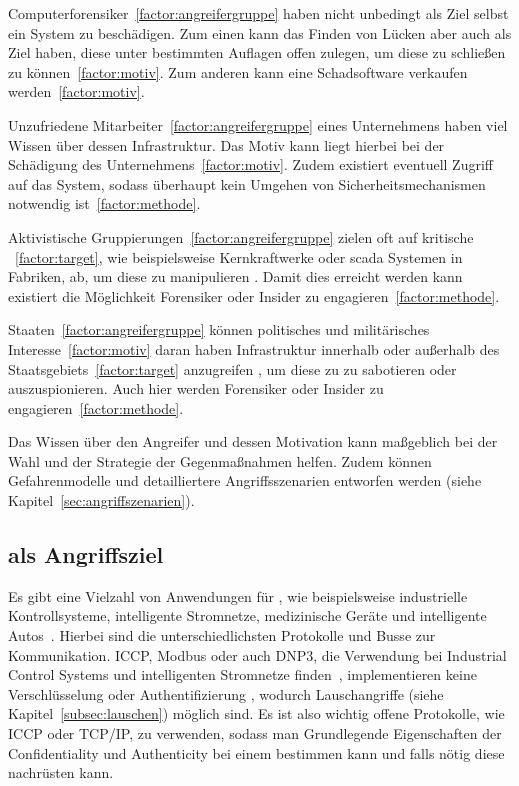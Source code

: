 Computerforensiker~\ref{factor:angreifergruppe} haben nicht unbedingt als Ziel selbst ein System zu beschädigen.
Zum einen kann das Finden von Lücken aber auch als Ziel haben, diese unter bestimmten Auflagen offen zulegen, um diese zu schließen zu können~\ref{factor:motiv}. 
Zum anderen kann eine Schadsoftware verkaufen werden~\ref{factor:motiv}. 

Unzufriedene Mitarbeiter~\ref{factor:angreifergruppe} eines Unternehmens haben viel Wissen über dessen Infrastruktur.
Das Motiv kann liegt hierbei bei der Schädigung des Unternehmens~\ref{factor:motiv}.
Zudem existiert eventuell Zugriff auf das System, sodass überhaupt kein Umgehen von Sicherheitsmechanismen notwendig ist~\ref{factor:methode}.~\cite{CAS+09,WYX+10}

Aktivistische Gruppierungen~\ref{factor:angreifergruppe} zielen oft auf kritische \cps~\ref{factor:target}, wie beispielsweise Kernkraftwerke oder \gls{scada} Systemen in Fabriken, ab, um diese zu manipulieren \cite{CAS+09,HLL+17}. 
Damit dies erreicht werden kann existiert die Möglichkeit Forensiker oder Insider zu engagieren~\ref{factor:methode}.~\cite{WYX+10}

Staaten~\ref{factor:angreifergruppe} können politisches und militärisches Interesse~\ref{factor:motiv} daran haben Infrastruktur innerhalb oder außerhalb des Staatsgebiets~\ref{factor:target} anzugreifen \cite{CAS+09}, um diese zu zu sabotieren oder auszuspionieren.
Auch hier werden Forensiker oder Insider zu engagieren~\ref{factor:methode}.

Das Wissen über den Angreifer und dessen Motivation kann maßgeblich bei der Wahl und der Strategie der Gegenmaßnahmen helfen.
Zudem können Gefahrenmodelle und detailliertere Angriffsszenarien entworfen werden (siehe Kapitel~\ref{sec:angriffszenarien}).


\subsection{ als Angriffsziel}\label{subsec:angriffsziel}
Es gibt eine Vielzahl von Anwendungen für \cps, wie beispielsweise industrielle Kontrollsysteme, intelligente Stromnetze, medizinische Geräte und intelligente Autos~\cite{HLL+17}.
Hierbei sind die unterschiedlichsten Protokolle und Busse zur Kommunikation.
ICCP, Modbus oder auch DNP3, die Verwendung bei Industrial Control Systems und intelligenten Stromnetze finden~\cite{HLL+17}, implementieren keine Verschlüsselung oder Authentifizierung \cite{HUM 124,HUM 38,HUM 69}, wodurch Lauschangriffe (siehe Kapitel~\ref{subsec:lauschen}) möglich sind.
Es ist also wichtig offene Protokolle, wie ICCP oder TCP/IP, zu verwenden, sodass man Grundlegende Eigenschaften der Confidentiality und Authenticity bei einem \cps bestimmen kann und falls nötig diese nachrüsten kann.

